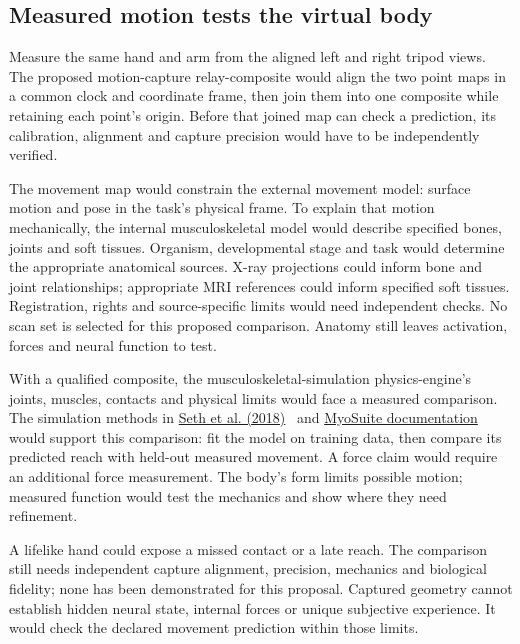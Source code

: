 \subsection{Measured motion tests the virtual body}
Measure the same hand and arm from the aligned left and right tripod views.
The proposed motion-capture relay-composite would align the two point maps
in a common clock and coordinate frame, then join them into one composite
while retaining each point's origin. Before that joined map can check a
prediction, its calibration, alignment and capture precision would have to
be independently verified.

The movement map would constrain the external movement model: surface motion
and pose in the task's physical frame. To explain that motion mechanically,
the internal musculoskeletal model would describe specified bones, joints
and soft tissues. Organism, developmental stage and task would determine the
appropriate anatomical sources. X-ray projections could inform bone and
joint relationships; appropriate MRI references could inform specified soft
tissues. Registration, rights and source-specific limits would need independent
checks. No scan set is selected for this proposed comparison. Anatomy still
leaves activation, forces and neural function to test.

With a qualified composite, the musculoskeletal-simulation physics-engine's
joints, muscles, contacts and physical limits would face a measured comparison.
The simulation methods in \href{https://journals.plos.org/ploscompbiol/article?id=10.1371/journal.pcbi.1006223}{Seth et al. (2018)}~\cite{opensim2018} and
\href{https://myosuite.readthedocs.io/en/latest/}{MyoSuite documentation}~\cite{myosuiteDocsUndated} would support this comparison: fit the model on training
data, then compare its predicted reach with held-out measured movement. A force claim would require an additional force
measurement. The body's form limits possible motion; measured function would
test the mechanics and show where they need refinement.


A lifelike hand could expose a missed contact or a late reach. The comparison
still needs independent capture alignment, precision, mechanics and biological
fidelity; none has been demonstrated for this proposal. Captured geometry
cannot establish hidden neural state, internal forces or unique subjective
experience. It would check the declared movement prediction within those limits.

